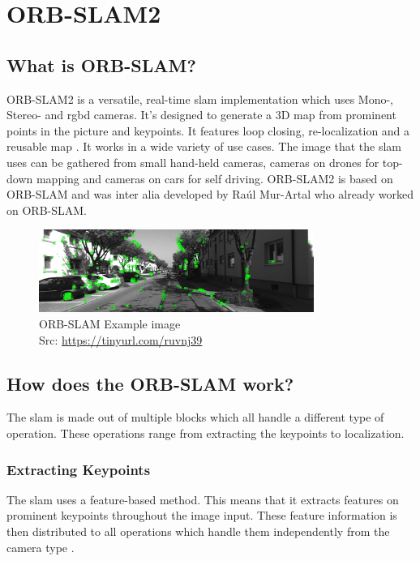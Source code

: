 
\chapter{ORB-SLAM2\authorA}\label{ref:orbslam}

\section{What is ORB-SLAM?}
ORB-SLAM2 is a versatile, real-time \gls{slam} implementation which uses Mono-, Stereo- and \gls{rgbd} cameras. It's designed to generate a 3D map from prominent points in the picture and keypoints. It features loop closing, re-localization and a reusable map \cite{orbslam2}. It works in a wide variety of use cases. The image that the \gls{slam} uses can be gathered from small hand-held cameras, cameras on drones for top-down mapping and cameras on cars for self driving.
ORB-SLAM2 is based on ORB-SLAM and was inter alia developed by Raúl Mur-Artal who already worked on ORB-SLAM.\newline
\begin{figure}[h]
	\centering
	\includegraphics[width=0.8\textwidth]{./media/images/orb-slam-kitti-dataset.png}
  	\caption{ORB-SLAM Example image
  	\\Src: \url{https://tinyurl.com/ruvnj39}}
  	\label{orbslamkittidataset}
\end{figure}

\section{How does the ORB-SLAM work?}

The \gls{slam} is made out of multiple blocks which all handle a different type of operation. These operations range from extracting the keypoints to localization.

\subsection{Extracting Keypoints}
The \gls{slam} uses a feature-based method. This means that it extracts features on prominent keypoints throughout the image input. These feature information is then distributed to all operations which handle them independently from the camera type \cite{orbslam2}.  \newpage


